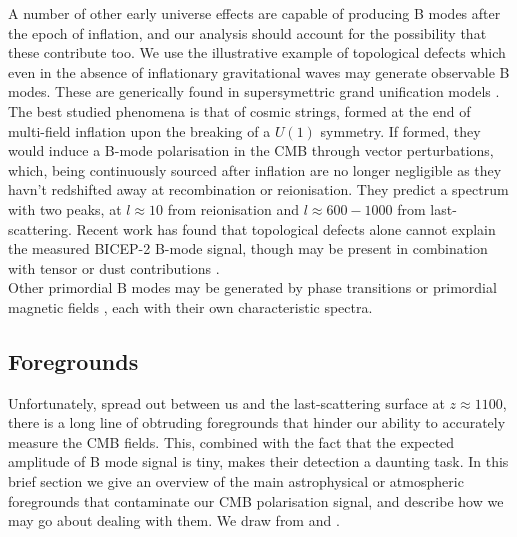 \documentclass[a4paper,10pt]{article}
\begin{document}
A number of other early universe effects are capable of producing B modes after the epoch of inflation, and our analysis should account for the possibility that these contribute too. We use the illustrative example of topological defects which even in the absence of inflationary gravitational waves may generate observable B modes. These are generically found in supersymettric grand unification models \cite{CMBPol}.\\

The best studied phenomena is that of cosmic strings, formed at the end of multi-field inflation upon the breaking of a $U(1)$ symmetry. If formed, they would induce a B-mode polarisation in the CMB through vector perturbations, which, being continuously sourced after inflation are no longer negligible as they havn't redshifted away at recombination or reionisation. They predict a spectrum with two peaks, at $l\approx10$ from reionisation and $l\approx 600-1000$ from last-scattering. Recent work has found that topological defects alone cannot explain the measured BICEP-2 B-mode signal, though may be present in combination with tensor or dust contributions \cite{baddefects}.\\

Other primordial B modes may be generated by phase transitions \cite{phase} or primordial magnetic fields \cite{magnetic}, each with their own characteristic spectra.

\subsection{Foregrounds}

Unfortunately, spread out between us and the last-scattering surface at $z\approx 1100$, there is a long line of obtruding foregrounds that hinder our ability to accurately measure the CMB fields. This, combined with the fact that the expected amplitude of B mode signal is tiny, makes their detection a daunting task. In this brief section we give an overview of the main astrophysical or atmospheric foregrounds that contaminate our CMB polarisation signal, and describe how we may go about dealing with them. We draw from \cite{thesis} and \cite{foregrounds}.\\
\end{document}
